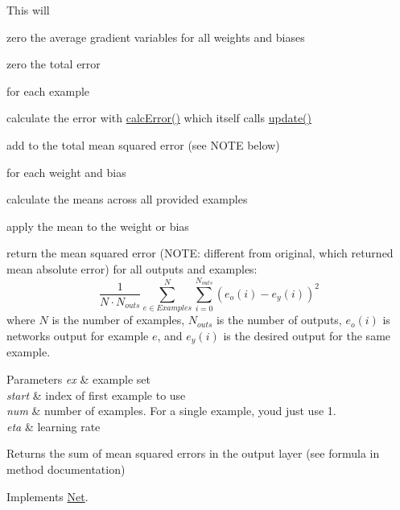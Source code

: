 This will
\begin{DoxyItemize}
\item zero the average gradient variables for all weights and biases
\item zero the total error
\item for each example
\begin{DoxyItemize}
\item calculate the error with \hyperlink{classBPNet_a98e5db7247f0358375c27d1bb091f6ab}{calc\+Error()} which itself calls \hyperlink{classBPNet_af60f5bfa6cb7dffd75a9a127b811a208}{update()}
\item add to the total mean squared error (see N\+O\+TE below)
\end{DoxyItemize}
\item for each weight and bias
\begin{DoxyItemize}
\item calculate the means across all provided examples
\item apply the mean to the weight or bias
\end{DoxyItemize}
\item return the mean squared error (N\+O\+TE\+: different from original, which returned mean absolute error) for all outputs and examples\+: \[ \frac{1}{N\cdot N_{outs}}\sum^N_{e \in Examples} \sum_{i=0}^{N_{outs}} (e_o(i) - e_y(i))^2 \] where $N$ is the number of examples, $N_{outs}$ is the number of outputs, $e_o(i)$ is network\textquotesingle{}s output for example $e$, and $e_y(i)$ is the desired output for the same example. 
\begin{DoxyParams}{Parameters}
{\em ex} & example set \\
\hline
{\em start} & index of first example to use \\
\hline
{\em num} & number of examples. For a single example, you\textquotesingle{}d just use 1. \\
\hline
{\em eta} & learning rate \\
\hline
\end{DoxyParams}
\begin{DoxyReturn}{Returns}
the sum of mean squared errors in the output layer (see formula in method documentation) 
\end{DoxyReturn}

\end{DoxyItemize}

Implements \hyperlink{classNet_a6ac1fa9f916aa77906581af9140b8175}{Net}.



